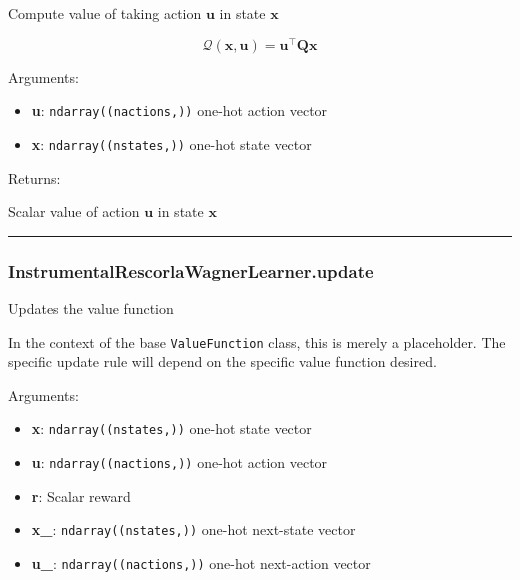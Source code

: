 Compute value of taking action \(\mathbf u\) in state \(\mathbf x\)

\[
\mathcal Q(\mathbf x, \mathbf u) = \mathbf u^\top \mathbf Q \mathbf x
\]

Arguments:

\begin{itemize}
\tightlist
\item
  \textbf{u}: \texttt{ndarray((nactions,))} one-hot action vector
\item
  \textbf{x}: \texttt{ndarray((nstates,))} one-hot state vector
\end{itemize}

Returns:

Scalar value of action \(\mathbf u\) in state \(\mathbf x\)

\begin{center}\rule{0.5\linewidth}{\linethickness}\end{center}

\hypertarget{instrumentalrescorlawagnerlearner.update}{%
\subsubsection{InstrumentalRescorlaWagnerLearner.update}\label{instrumentalrescorlawagnerlearner.update}}

\begin{Shaded}
\begin{Highlighting}[]
\end{Highlighting}
\end{Shaded}

Updates the value function

In the context of the base \texttt{ValueFunction} class, this is merely
a placeholder. The specific update rule will depend on the specific
value function desired.

Arguments:

\begin{itemize}
\tightlist
\item
  \textbf{x}: \texttt{ndarray((nstates,))} one-hot state vector
\item
  \textbf{u}: \texttt{ndarray((nactions,))} one-hot action vector
\item
  \textbf{r}: Scalar reward
\item
  \textbf{x\_}: \texttt{ndarray((nstates,))} one-hot next-state vector
\item
  \textbf{u\_}: \texttt{ndarray((nactions,))} one-hot next-action vector
\end{itemize}


